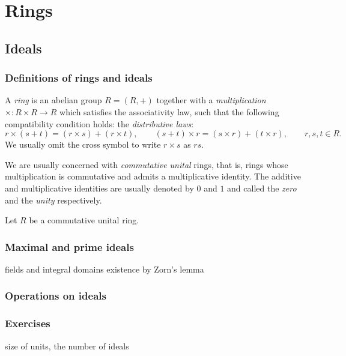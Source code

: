 \documentclass{../../large}
\begin{document}
\part{Rings}
\chapter{Ideals}
\section{Definitions of rings and ideals}
\begin{prb}
A \emph{ring} is an abelian group $R=(R,+)$ together with a \emph{multiplication} $\times:R\times R\to R$ which satisfies the associativity law, such that the following compatibility condition holds: the \emph{distributive laws}:
\[r\times(s+t)=(r\times s)+(r\times t),\qquad(s+t)\times r=(s\times r)+(t\times r),\qquad r,s,t\in R.\]
We usually omit the cross symbol to write $r\times s$ as $rs$.

We are usually concerned with \emph{commutative unital} rings, that is, rings whose multiplication is commutative and admits a multiplicative identity.
The additive and multiplicative identities are usually denoted by $0$ and $1$ and called the \emph{zero} and the \emph{unity} respectively.
\end{prb}


\begin{prb}
Let $R$ be a commutative unital ring.
\end{prb}

\begin{prb}
\end{prb}
\begin{prb}
\end{prb}


\section{Maximal and prime ideals}
fields and integral domains
existence by Zorn's lemma

\section{Operations on ideals}

\section*{Exercises}
size of units, the number of ideals
\end{document}
